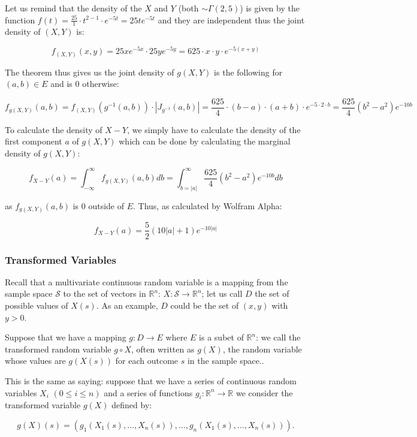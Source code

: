 \documentclass{article}
\newcommand\R{{\mathbb R} }
\renewcommand\S{{\mathcal S}}
\newcommand\goesto{{\longrightarrow}}
\begin{document}
Let us remind that the density of the $X$ and $Y$ (both $\sim \Gamma(2,5)$) is given by the function $f(t) = \frac{25}{1}\cdot t^{2-1}\cdot e^{-5t} = 25te^{-5t}$ and they are independent thus the joint density of $(X,Y)$  is:

$$f_{(X,Y)}(x,y) = 25xe^{-5x} \cdot 25ye^{-5y} = 625\cdot x \cdot y \cdot e^{-5(x+y)}$$

The theorem thus gives us the joint density of $g(X,Y)$ is the following for $(a,b)\in E$ and is $0$ otherwise:

$$f_{g(X,Y)}(a,b) = f_{(X,Y)}(g^{-1}(a,b))\cdot | J_{g^{-1}}(a,b)| = \frac{625}{4}\cdot (b-a) \cdot (a+b) \cdot e^{-5\cdot 2\cdot b} = \frac{625}{4}(b^2-a^2)e^{-10b}$$ 

To calculate the density of $X-Y$, we simply have to calculate the density of the first component $a$ of $g(X,Y)$ which can be done by calculating the marginal density of $g(X,Y)$:

$$f_{X-Y}(a) = \int_{-\infty}^\infty f_{g(X,Y)}(a,b)db = \int_{b=|a|}^\infty \frac{625}{4}(b^2-a^2)e^{-10b} db$$

as $f_{g(X,Y)}(a,b)$ is $0$ outside of $E$. Thus, as calculated by Wolfram Alpha:

$$ f_{X-Y}(a) = \frac{5}{2}(10|a|+1)e^{-10|a|} $$



\subsubsection{Transformed Variables}

Recall that  a multivariate continuous random variable is a mapping from the sample space ${\S}$ to the set of vectors in $\R^n$: $X: {\S } \rightarrow \R^n$; let us call $D$ the set of possible values of $X(s)$. As an example, $D$ could be the set of $(x,y)$ with $y>0$.  

Suppose that we have a mapping  $g: D \rightarrow E$ where $E$ is a subet of $\R^n$:  we call the transformed random variable $g \circ X$, often written as $g(X)$, the random variable whose values are $g(X(s))$ for each outcome $s$ in the sample space..  

This is the same as saying: suppose that we have a series of continuous random variables $X_i$  $(0\le i \le n)$ and a series of functions $g_i: \R^n \goesto \R$ we consider the transformed variable $g(X)$ defined by:

$$g(X)(s) = (g_1(X_1(s),\dots,X_n(s)), \dots, g_n(X_1(s),\dots,X_n(s))).$$
\end{document}
